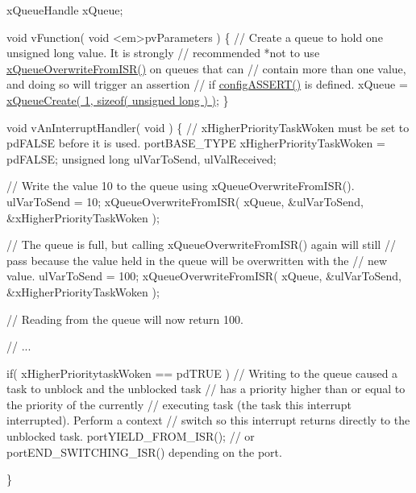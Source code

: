 \begin{DoxyPre} xQueueHandle xQueue;\end{DoxyPre}



\begin{DoxyPre} void vFunction( void <em>pvParameters )
 \{
    // Create a queue to hold one unsigned long value.  It is strongly
    // recommended *not to use \hyperlink{queue_8h_abdcd6a86ef82034d002193e79cfd3ce8}{xQueueOverwriteFromISR()} on queues that can
    // contain more than one value, and doing so will trigger an assertion
    // if \hyperlink{FreeRTOS_8h_a228c70cd48927d6ab730ed1a6dfbe35f}{configASSERT()} is defined.
    xQueue = \hyperlink{queue_8h_aeb858b824bd74a934ea7ebb81af2a6bb}{xQueueCreate( 1, sizeof( unsigned long ) )};
\}\end{DoxyPre}



\begin{DoxyPre}void vAnInterruptHandler( void )
\{
// xHigherPriorityTaskWoken must be set to pdFALSE before it is used.
portBASE\_TYPE xHigherPriorityTaskWoken = pdFALSE;
unsigned long ulVarToSend, ulValReceived;
\begin{DoxyVerb}// Write the value 10 to the queue using xQueueOverwriteFromISR().
ulVarToSend = 10;
xQueueOverwriteFromISR( xQueue, &ulVarToSend, &xHigherPriorityTaskWoken );

// The queue is full, but calling xQueueOverwriteFromISR() again will still
// pass because the value held in the queue will be overwritten with the
// new value.
ulVarToSend = 100;
xQueueOverwriteFromISR( xQueue, &ulVarToSend, &xHigherPriorityTaskWoken );

// Reading from the queue will now return 100.

// ...

if( xHigherPrioritytaskWoken == pdTRUE )
{
    // Writing to the queue caused a task to unblock and the unblocked task
    // has a priority higher than or equal to the priority of the currently
    // executing task (the task this interrupt interrupted).  Perform a context
    // switch so this interrupt returns directly to the unblocked task.
    portYIELD_FROM_ISR(); // or portEND_SWITCHING_ISR() depending on the port.
}
\end{DoxyVerb}

\}
 \end{DoxyPre}
 